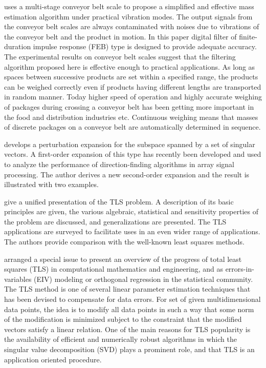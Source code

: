 \documentclass[11pt]{article}
\begin{document}
\citet{Tasaki07} uses a multi-stage conveyor belt scale to propose a simplified and effective mass estimation algorithm under practical vibration modes. The output signals from the conveyor belt scales are always contaminated with noises due to vibrations of the conveyor belt and the product in motion. In this paper digital filter of finite-duration impulse response (FEB) type is designed to provide adequate accuracy. The experimental results on conveyor belt scales suggest that the filtering algorithm proposed here is effective enough to practical applications. As long as spaces between successive products are set within a specified range, the products can be weighed correctly even if products having different lengths are transported in random manner.
Today higher speed of operation and highly accurate weighing of packages during crossing a conveyor belt has been getting more important in the food and distribution industries etc. Continuous weighing means that masses of discrete packages on a conveyor belt are automatically determined in sequence. 

\citet{Vaccaro94} develops a perturbation expansion for the subspace spanned by a set of singular vectors. A first-order expansion of this type has recently been developed and used to analyze the performance of direction-finding algorithms in array signal processing. The author derives a new second-order expansion and the result is illustrated with two examples.

\citet{VanHuffel91Book}  give a unified presentation of the TLS problem. A description of its basic principles are given, the various algebraic, statistical and sensitivity properties of the problem are discussed, and generalizations are presented. The TLS applications are surveyed to facilitate uses in an even wider range of applications. The authors provide comparison  with the well-known least squares methods.

\citet{VanHuffel07TLSeditorial} arranged a special issue to present an overview of the progress of total least squares (TLS) in computational mathematics and engineering, and as errors-in-variables (EIV) modeling or orthogonal regression in the statistical community. The TLS method is one of several linear parameter estimation techniques that has been devised to compensate for data errors. For set of given multidimensional data points, the idea is to modify all data points in such a way that some norm of the modification is minimized subject to the constraint that the modified vectors satisfy a linear relation. One of the main reasons for TLS popularity is the availability of efficient and numerically robust algorithms in which the singular value decomposition (SVD) plays a prominent role, and that TLS is an application oriented procedure.
\end{document}
